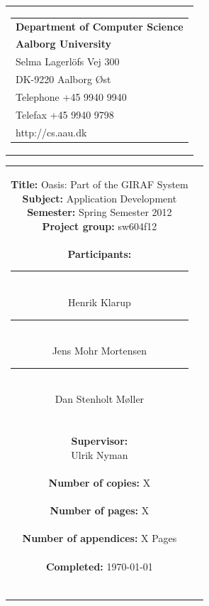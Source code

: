 \begin{nopagebreak}
\samepage 
\begin{tabular}{r}
\parbox{\textwidth}{
\hfill \parbox{6.2cm}{\begin{tabular}{l}
{\textsf\small \textbf{Department of Computer Science }}\\
{\textsf\small  \textbf{Aalborg University}}\\
{\textsf\small Selma Lagerl\"{o}fs Vej 300}\\
{\textsf\small DK-9220 Aalborg Øst}\\
{\textsf\small Telephone +45 9940 9940}\\
{\textsf\small Telefax +45 9940 9798}\\
{\textsf\small http://cs.aau.dk}
\end{tabular}}}
\end{tabular}

\begin{tabular}{cc}
\parbox{7cm}{
\vspace{-2.15cm}
\textbf{Title:} 
Oasis: Part of the GIRAF System\\
\textbf{Subject:} 
Application Development\\
\textbf{Semester:} Spring Semester 2012\\
\textbf{Project group:} sw604f12\\ \\
\textbf{Participants:} \\
\rule[-0.1cm]{5cm}{0.01cm} \\
Henrik Klarup \\
\rule[-0.1cm]{5cm}{0.01cm} \\
Jens Mohr Mortensen \\
\rule[-0.1cm]{5cm}{0.01cm} \\
Dan Stenholt M\o{}ller \\ \\ \\

\textbf{Supervisor:} \\
Ulrik Nyman\\ \\
\textbf{Number of copies:}
X \\ \\
\textbf{Number of pages:}
X \\ \\
\textbf{Number of appendices:}
X Pages\\ \\
\textbf{Completed:}
\today \\ \\
}


\end{tabular}
\end{nopagebreak}
